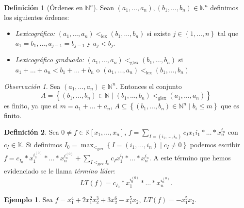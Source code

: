 \documentclass[10pt, spanish]{report}
\theoremstyle{definition}
\newtheorem*{defin}{Definición}
\newtheorem*{ej}{Ejemplo}
\theoremstyle{custom}
\theoremstyle{remark}
\newtheorem*{obs}{Observación}
\newcommand{\N}{\mathbb{N}}
\newcommand{\K}{\mathbb{K}}
\renewcommand{\leq}{\leqslant}
\newcommand{\fecha}[1]{\marginpar{\underline{\footnotesize{#1}}}}
\begin{document}
\begin{defin}[Órdenes en $\N^n$] 
    Sean $(a_1,\ldots,a_n), (b_1,\ldots,b_n)\in\N^n$ definimos los siguientes
    órdenes:
    \begin{itemize}
        \item 
            \textit{Lexicográfico:} $(a_1,\ldots,a_n)<_{\text{lex}}(b_1,\ldots,b_n)$ si
            existe $j\in\left\{ 1,\ldots,n \right\} $ tal que
            $a_1=b_1,\ldots,a_{j-1}=b_{j-1}$ y $a_j<b_j$.  
        \item
            \textit{Lexicográfico graduado:} $(a_1,\ldots,a_n)<_{\text{glex}}(b_1,\ldots,b_n)$ si
            $a_1+\ldots+a_n<b_1+\ldots+b_n$ o
            $(a_1,\ldots,a_n)<_{\text{lex}}(b_1,\ldots,b_n)$
    \end{itemize}

\end{defin}

\fecha{13/04}
\begin{obs}
    Sea $(a_1,\ldots,a_n)\in\N^n$. Entonces el conjunto
    \[A=\left\{(b_1,\ldots,b_n)\in\N\mid(b_1,\ldots,b_n)
    <_{\text{glex}}(a_1,\ldots,a_n)\right\}\]   
    es finito, ya que si $m=a_1+\ldots+a_n$, $A\subseteq\left\{
    (b_1,\ldots,b_n)\in\N^n \mid b_i \leq m \right\}$ que es finito.
\end{obs}

\begin{defin}
    Sea $0\neq f\in\K[x_1,\ldots, x_n]$,
    $f=\sum_{I=(i_1,\ldots,i_n)}c_Ix_1{i_1}*\ldots*x_n^{i_n}$ con $c_I\in\K$.
    Si definimos $I_0=\max_{<_{\text{glex}}}\left\{I=(i_1,\ldots,i_n)\mid
    c_I\neq 0\right\}$ podemos escribir
    $f=c_{I_0}*x_1^{i_0^{(0)}}*\ldots*x_n^{i_n^{(0)}}
    +\sum_{I<_{\text{glex}}I_0}c_Ix_1^{i_1}*\ldots*x_n^{i_n}$. A este término
    que hemos evidenciado se le llama \textit{término líder}:
    \[LT(f)=c_{I_0}*x_1^{i_0^{(0)}}*\ldots*x_n^{i_n^{(0)}}.\]
\end{defin}

\begin{ej}
    Sea $f=x_1^4+2x_1^2x_2^3+3x_2^6-x_1^5x_2$, $LT(f)=-x_1^5x_2$. 
\end{ej}
\end{document}
